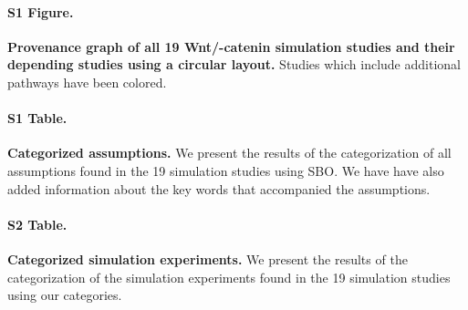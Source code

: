 \documentclass[10pt,letterpaper]{article}
\newcommand{\webprov}{\textit{WebProv}}
\newcommand{\bcat}{\textbeta-catenin}
\newcommand{\wnt}{Wnt}
\begin{document}
\paragraph*{S1 Figure.}\label{S1_FigClusters}
{\bf Provenance graph of all 19 \wnt{}/\bcat{} simulation studies and their depending studies using a circular layout.} Studies which include additional pathways have been colored.



\paragraph*{S1 Table.}\label{S1_TableAssumptions}
{\bf Categorized assumptions.} We present the results of the categorization of all assumptions found in the 19 simulation studies using SBO. We have have also added information about the key words that accompanied the assumptions.

\paragraph*{S2 Table.}\label{S1_TableExperiments}
{\bf Categorized simulation experiments.} We present the results of the categorization of the simulation experiments found in the 19 simulation studies using our categories.





\end{document}
